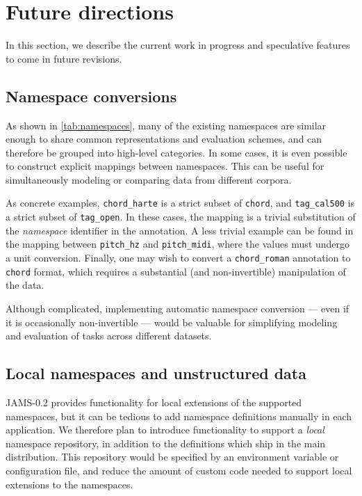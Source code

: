 \documentclass{article}
\begin{document}
\section{Future directions}\label{sec:future}
In this section, we describe the current work in progress and speculative features to
come in future revisions.

\subsection{Namespace conversions}
As shown in \cref{tab:namespaces}, many of the existing namespaces are similar enough to
share common representations and evaluation schemes, and can therefore be grouped into
high-level categories.
In some cases, it is even possible to construct explicit mappings between namespaces.
This can be useful for simultaneously modeling or comparing data from different corpora.

As concrete examples, \texttt{chord\_harte} is a strict subset of \texttt{chord}, and
\texttt{tag\_cal500} is a strict subset of \texttt{tag\_open}.  In these cases, the mapping
is a trivial substitution of the \emph{namespace} identifier in the annotation.  A less
trivial example can be found in the mapping between \texttt{pitch\_hz} and
\texttt{pitch\_midi}, where the values must undergo a unit conversion.
Finally, one may wish to convert a \texttt{chord\_roman} annotation 
to \texttt{chord} format, which requires a substantial (and non-invertible) 
manipulation of the data.

Although complicated, implementing automatic namespace conversion --- even if it is
occasionally non-invertible --- would be valuable for simplifying modeling and
evaluation of tasks across different datasets.


\subsection{Local namespaces and unstructured data}
JAMS-0.2 provides functionality for local extensions of the supported namespaces, but it
can be tedious to add namespace definitions manually in each application.  We therefore
plan to introduce functionality to support a \emph{local} namespace repository, in
addition to the definitions which ship in the main distribution.  This repository would
be specified by an environment variable or configuration file, and reduce the amount of
custom code needed to support local extensions to the namespaces.
\end{document}
